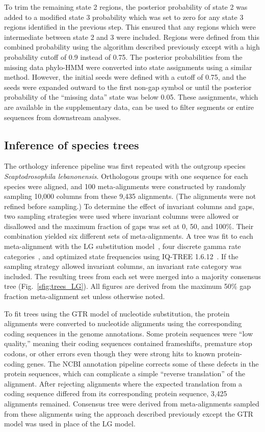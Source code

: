 To trim the remaining state 2 regions, the posterior probability of state 2 was added to a modified state 3 probability which was set to zero for any state 3 regions identified in the previous step. This ensured that any regions which were intermediate between state 2 and 3 were included. Regions were defined from this combined probability using the algorithm described previously except with a high probability cutoff of 0.9 instead of 0.75. The posterior probabilities from the missing data phylo-HMM were converted into state assignments using a similar method. However, the initial seeds were defined with a cutoff of 0.75, and the seeds were expanded outward to the first non-gap symbol or until the posterior probability of the ``missing data'' state was below 0.05. These assignments, which are available in the supplementary data, can be used to filter segments or entire sequences from downstream analyses.

\subsection{Inference of species trees}
The orthology inference pipeline was first repeated with the outgroup species \textit{Scaptodrosophila lebanonensis}. Orthologous groups with one sequence for each species were aligned, and 100 meta-alignments were constructed by randomly sampling 10,000 columns from these 9,435 alignments. (The alignments were not refined before sampling.) To determine the effect of invariant columns and gaps, two sampling strategies were used where invariant columns were allowed or disallowed and the maximum fraction of gaps was set at 0, 50, and 100\%. Their combination yielded six different sets of meta-alignments. A tree was fit to each meta-alignment with the LG substitution model~\cite{Le2008}, four discrete gamma rate categories~\cite{Yang1994}, and optimized state frequencies using IQ-TREE 1.6.12~\cite{Nguyen2014}. If the sampling strategy allowed invariant columns, an invariant rate category was included. The resulting trees from each set were merged into a majority consensus tree (Fig.~\ref{sfig:trees_LG}). All figures are derived from the maximum 50\% gap fraction meta-alignment set unless otherwise noted.

To fit trees using the GTR model of nucleotide substitution, the protein alignments were converted to nucleotide alignments using the corresponding coding sequences in the genome annotations. Some protein sequences were ``low quality,'' meaning their coding sequences contained frameshifts, premature stop codons, or other errors even though they were strong hits to known protein-coding genes. The NCBI annotation pipeline corrects some of these defects in the protein sequences, which can complicate a simple ``reverse translation'' of the alignment. After rejecting alignments where the expected translation from a coding sequence differed from its corresponding protein sequence, 3,425 alignments remained. Consensus tree were derived from meta-alignments sampled from these alignments using the approach described previously except the GTR model was used in place of the LG model.

